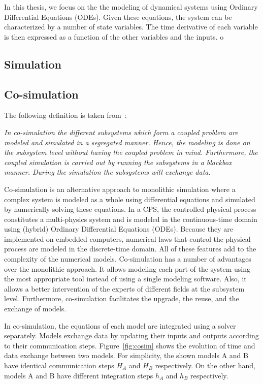 In this thesis, we focus on the the modeling of dynamical systems using Ordinary Differential Equations (ODEs). Given these equations, the system can be characterized by a number of state variables. The time derivative of each variable is then expressed as a function of the other variables and the inputs. %
o
\subsection{Simulation}

\subsection{Co-simulation}

The following definition is taken from~\cite{Sicklinger:2014}:

\textit{
In co-simulation the different subsystems which form a coupled problem are modeled and simulated in a segregated manner. Hence, the modeling is done on the subsystem level without having the coupled problem in mind. Furthermore, the coupled simulation is carried out by running the subsystems in a blackbox manner. During the simulation the subsystems will exchange data.}


Co-simulation is an alternative approach to monolithic simulation where a complex system is modeled as a whole using differential equations and simulated by numerically solving these equations. In a CPS, the controlled physical process constitutes a multi-physics system and is modeled in the continuous-time domain using (hybrid) Ordinary Differential Equations (ODEs). Because they are implemented on embedded computers, numerical laws that control the physical process are modeled in the discrete-time domain. All of these features add to the complexity of the numerical models. Co-simulation has a number of advantages over the monolithic approach. It allows modeling each part of the system using the most appropriate tool instead of using a single modeling software. Also, it allows a better intervention of the experts of different fields at the subsystem level. Furthermore, co-simulation facilitates the upgrade, the reuse, and the exchange of models. 

In co-simulation, the equations of each model are integrated using a solver separately. Models exchange data by updating their inputs and outputs according to their communication steps. Figure~\ref{fig:cosim} shows the evolution of time and data exchange between two models. For simplicity, the shown models A and B have identical communication steps $H_A$ and $H_B$ respectively. On the other hand, models A and B have different integration steps $h_A$ and $h_B$ respectively.

